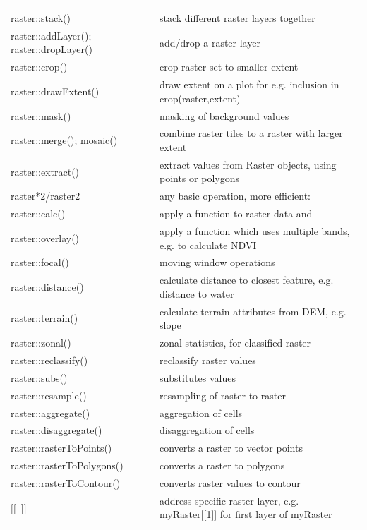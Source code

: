 \documentclass[a4paper,10pt,landscape]{article}
\begin{document}
\begin{multicols}{3}
\begin{tabular}{@{}p{\the\MyLen}%
                @{}p{\linewidth-\the\MyLen}@{}}
 &  \\                
raster::stack() & stack different raster layers together \\
raster::addLayer(); raster::dropLayer()	& add/drop a raster layer\\
raster::crop() 		& crop raster set to smaller extent  \\
raster::drawExtent()	& draw extent on a plot for e.g. inclusion in crop(raster,extent)\\
raster::mask() 		& masking of background values \\
raster::merge(); mosaic() & combine raster tiles to a raster with larger extent \\
raster::extract() 	& extract values from Raster objects, using points or polygons  \\
raster*2/raster2 & any basic operation, more efficient: \\                
raster::calc()  	& apply a function to raster data and\\
raster::overlay()       & apply a function which uses multiple bands, e.g. to calculate NDVI \\
raster::focal()         & moving window operations \\
raster::distance()      & calculate distance to closest feature, e.g. distance to water\\
raster::terrain() 	& calculate terrain attributes from DEM, e.g. slope \\
raster::zonal()         & zonal statistics, for classified raster\\
raster::reclassify()	& reclassify raster values \\
raster::subs()		& substitutes values \\
raster::resample() 	& resampling of raster to raster \\
raster::aggregate()	& aggregation of cells \\
raster::disaggregate()	& disaggregation of cells \\
raster::rasterToPoints() & converts a raster to vector points	\\
raster::rasterToPolygons() & converts a raster to polygons \\
raster::rasterToContour()  & converts raster values to contour \\
$[[$\ $]]$		& address specific raster layer, e.g. myRaster[[1]] for first layer of myRaster    \\  

\end{tabular}
\end{multicols}
\end{document}

